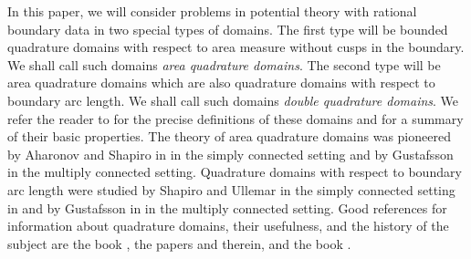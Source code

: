 \documentclass[12pt]{amsart}
\numberwithin{equation}{section}
\begin{document}
In this paper, we will consider problems in
potential theory with rational boundary data in two
special types of domains. The first type will be
bounded quadrature domains with respect to area
measure without cusps in the boundary. We shall
call such domains {\it area quadrature domains}.
The second type will be area quadrature domains
which are also quadrature domains with respect
to boundary arc length. We shall call such domains
{\it double quadrature domains}. We refer the
reader to \cite{BGS} for the precise definitions
of these domains and for a summary of their basic
properties. The theory of area quadrature domains was
pioneered by Aharonov and Shapiro in \cite{AS} in
the simply connected setting and by Gustafsson
\cite{G} in the multiply connected setting. Quadrature
domains with respect to boundary arc length were
studied by Shapiro and Ullemar in the simply
connected setting in \cite{SU} and by Gustafsson
in \cite{G2} in the multiply connected setting.
Good references for information about quadrature
domains, their usefulness, and the history of the
subject are the book \cite{EGKP}, the papers
\cite{GS} and \cite{C} therein, and the book \cite{S}.
\end{document}
